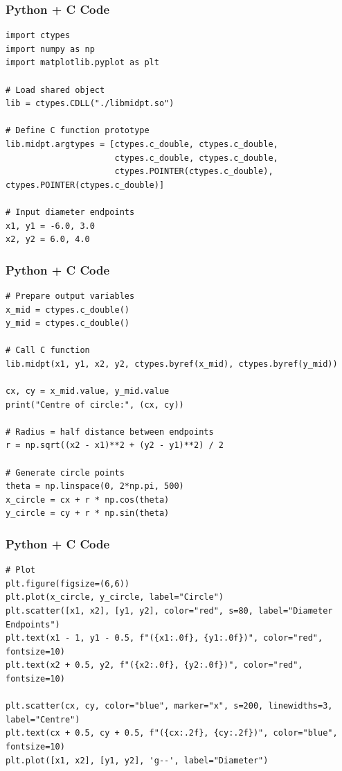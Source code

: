 \documentclass{beamer}
\begin{document}
\begin{frame}[fragile]
    \frametitle{Python + C Code}
    \begin{lstlisting}
import ctypes
import numpy as np
import matplotlib.pyplot as plt

# Load shared object
lib = ctypes.CDLL("./libmidpt.so")

# Define C function prototype
lib.midpt.argtypes = [ctypes.c_double, ctypes.c_double,
                      ctypes.c_double, ctypes.c_double,
                      ctypes.POINTER(ctypes.c_double), ctypes.POINTER(ctypes.c_double)]

# Input diameter endpoints
x1, y1 = -6.0, 3.0
x2, y2 = 6.0, 4.0

    \end{lstlisting}
\end{frame}

\begin{frame}[fragile]
    \frametitle{Python + C Code}
    \begin{lstlisting}
# Prepare output variables
x_mid = ctypes.c_double()
y_mid = ctypes.c_double()

# Call C function
lib.midpt(x1, y1, x2, y2, ctypes.byref(x_mid), ctypes.byref(y_mid))

cx, cy = x_mid.value, y_mid.value
print("Centre of circle:", (cx, cy))

# Radius = half distance between endpoints
r = np.sqrt((x2 - x1)**2 + (y2 - y1)**2) / 2

# Generate circle points
theta = np.linspace(0, 2*np.pi, 500)
x_circle = cx + r * np.cos(theta)
y_circle = cy + r * np.sin(theta)

    \end{lstlisting}
\end{frame}

\begin{frame}[fragile]
    \frametitle{Python + C Code}
    \begin{lstlisting}
# Plot
plt.figure(figsize=(6,6))
plt.plot(x_circle, y_circle, label="Circle")
plt.scatter([x1, x2], [y1, y2], color="red", s=80, label="Diameter Endpoints")
plt.text(x1 - 1, y1 - 0.5, f"({x1:.0f}, {y1:.0f})", color="red", fontsize=10)
plt.text(x2 + 0.5, y2, f"({x2:.0f}, {y2:.0f})", color="red", fontsize=10)

plt.scatter(cx, cy, color="blue", marker="x", s=200, linewidths=3, label="Centre")
plt.text(cx + 0.5, cy + 0.5, f"({cx:.2f}, {cy:.2f})", color="blue", fontsize=10)
plt.plot([x1, x2], [y1, y2], 'g--', label="Diameter")

    \end{lstlisting}
\end{frame}
\end{document}

